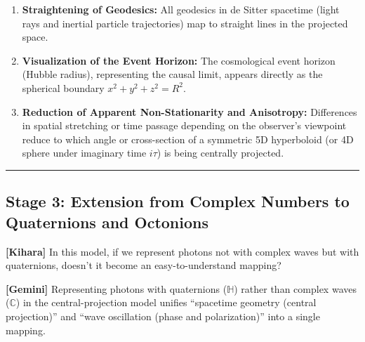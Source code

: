 \documentclass[
  a4paper,
]{article}
\providecommand{\tightlist}{%
  \setlength{\itemsep}{0pt}\setlength{\parskip}{0pt}}
\begin{document}
\begin{enumerate}
\def\labelenumi{\arabic{enumi}.}
\tightlist
\item
  \textbf{Straightening of Geodesics:} All geodesics in de Sitter
  spacetime (light rays and inertial particle trajectories) map to
  straight lines in the projected space.
\item
  \textbf{Visualization of the Event Horizon:} The cosmological event
  horizon (Hubble radius), representing the causal limit, appears
  directly as the spherical boundary \(x^2 + y^2 + z^2 = R^2\).
\item
  \textbf{Reduction of Apparent Non-Stationarity and Anisotropy:}
  Differences in spatial stretching or time passage depending on the
  observer's viewpoint reduce to which angle or cross-section of a
  symmetric 5D hyperboloid (or 4D sphere under imaginary time \(i\tau\))
  is being centrally projected.
\end{enumerate}

\begin{center}\rule{0.5\linewidth}{0.5pt}\end{center}

\subsection{Stage 3: Extension from Complex Numbers to Quaternions and
Octonions}\label{stage-3-extension-from-complex-numbers-to-quaternions-and-octonions}

\textbf{{[}Kihara{]}} In this model, if we represent photons not with
complex waves but with quaternions, doesn't it become an
easy-to-understand mapping?

\textbf{{[}Gemini{]}} Representing photons with quaternions
(\(\mathbb{H}\)) rather than complex waves (\(\mathbb{C}\)) in the
central-projection model unifies ``spacetime geometry (central
projection)'' and ``wave oscillation (phase and polarization)'' into a
single mapping.
\end{document}
